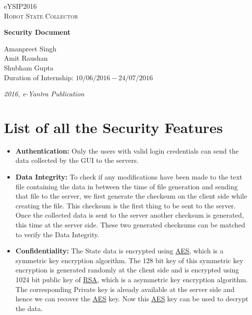 \documentclass[a4paper,12pt,oneside]{book}
\begin{document}
\begin{titlepage}
\raggedright
{\Large eYSIP2016\\[1cm]}
{\Huge\scshape Robot State Collector \\[.1in]}
\vspace*{\fill}
\begingroup
\centering

\Large \textbf{Security Document}

\endgroup
\vspace*{\fill}
\begin{flushright}
{\large Amanpreet Singh \\}
{\large Amit Raushan \\}
{\large Shubham Gupta \\}
{\large Duration of Internship: $ 10/06/2016-24/07/2016 $ \\}
\end{flushright}

{\itshape 2016, e-Yantra Publication}
\end{titlepage}

\chapter[Project Tag]{List of all the Security Features}

\begin{itemize}
    \item \textbf{Authentication:} Only the users with valid login credentials can send the data collected by the GUI to the servers.
    \item \textbf{Data Integrity:} To check if any modifications have been made to the text file containing the data in between the time of file generation and sending that file to the server, we first generate the checksum on the client side while creating the file. This  checksum is the first thing to be sent to the server. Once the collected data is sent to the server another checksum is generated, this time at the server side. These two generated checksums can be matched to verify the Data Integrity.
    \item \textbf{Confidentiality:} The State data is encrypted using \href{https://en.wikipedia.org/wiki/Advanced_Encryption_Standard_process}{AES}, which is a symmetric key encryption algorithm. The 128 bit key of this symmetric key encryption is generated randomly at the client side and is encrypted using 1024 bit public key of \href{https://en.wikipedia.org/wiki/RSA_(cryptosystem)}{RSA}, which is a asymmetric key encryption algorithm. The corresponding Private key is already available at the server side and hence we can recover the \href{https://en.wikipedia.org/wiki/Advanced_Encryption_Standard_process}{AES} key. Now this \href{https://en.wikipedia.org/wiki/Advanced_Encryption_Standard_process}{AES} key can be used to decrypt the data.

\end{itemize}
\end{document}
